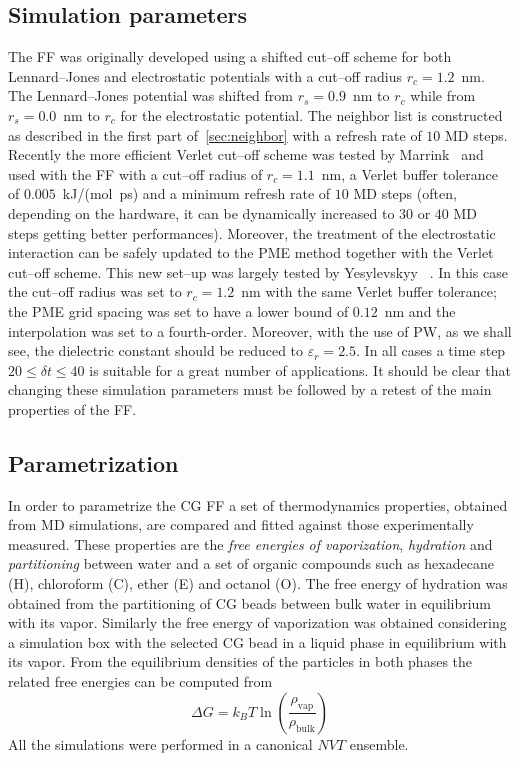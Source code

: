 \subsection{Simulation parameters}
The \martini \ac{FF} was originally developed using a shifted cut--off scheme for both Lennard--Jones and
electrostatic potentials with a cut--off radius $r_c = 1.2$~nm. The Lennard--Jones potential was shifted from
$r_s = 0.9$~nm to $r_c$ while from $r_s = 0.0$~nm to $r_c$ for the electrostatic potential. The neighbor list is
constructed as described in the first part of~\ref{sec:neighbor} with a refresh rate of $10$ \ac{MD} steps.
Recently the more efficient Verlet cut--off scheme was tested by Marrink \etal\, \cite{MartiniReview} and used
with the \martini \ac{FF} with a cut--off radius of $r_c = 1.1$~nm, a Verlet buffer tolerance of $0.005$~kJ/(mol\
ps) and a minimum refresh rate of $10$ \ac{MD} steps (often, depending on the hardware, it can be dynamically
increased to $30$ or $40$ \ac{MD} steps getting better performances).  Moreover, the treatment of the
electrostatic interaction can be safely updated to the \ac{PME} method together with the Verlet cut--off scheme.
This new set--up was largely tested by Yesylevskyy \etal\, \cite{PW}. In this case the cut--off radius was set to
$r_c = 1.2$~nm with the same Verlet buffer tolerance; the \ac{PME} grid spacing was set to have a lower bound of
$0.12$~nm and the interpolation was set to a fourth-order. Moreover, with the use of \ac{PW}, as we shall see,
the dielectric constant should be reduced to $\varepsilon_r = 2.5$. In all cases a time step
$20\le\delta t\le 40$ is suitable for a great number of applications. It should be clear that changing these
simulation parameters must be followed by a retest of the main properties of the \martini \ac{FF}.

\subsection{Parametrization}
\label{sec:martiniParam}
In order to parametrize the \martini \ac{CG} \ac{FF} a set of thermodynamics properties, obtained from \ac{MD}
simulations, are compared and fitted against those experimentally measured. These properties are the \textit{free
energies of vaporization}, \textit{hydration} and \textit{partitioning} between water and a set of organic
compounds such as hexadecane (H), chloroform (C), ether (E) and octanol (O). The free energy of hydration was
obtained from the partitioning of \ac{CG} beads between bulk water in equilibrium with its vapor. Similarly the
free energy of vaporization was obtained considering a simulation box with the selected \ac{CG} bead in a liquid
phase in equilibrium with its vapor. From the equilibrium densities of the particles in both phases the related
free energies can be computed from
\begin{equation*}
	\Delta G = k_B T\ln \left ( \frac{\rho_{\text{vap}}}{\rho_{\text{bulk}}} \right )
\end{equation*}
All the simulations were performed in a canonical $NVT$ ensemble.

